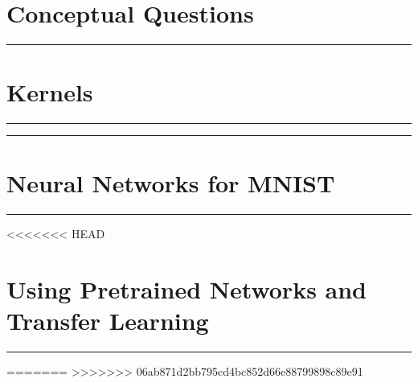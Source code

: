 \documentclass{article}
\begin{document}


\section*{Conceptual Questions}
\noindent\rule{\textwidth}{1pt}\vspace{0.75mm}


\section*{Kernels}
\noindent\rule{\textwidth}{1pt}\vspace{0.75mm}


\noindent\rule{\textwidth}{1pt}\vspace{0.75mm}


\section*{Neural Networks for MNIST}
\noindent\rule{\textwidth}{1pt}\vspace{0.75mm}


<<<<<<< HEAD
\section*{Using Pretrained Networks and Transfer Learning}
\noindent\rule{\textwidth}{1pt}\vspace{0.75mm}


=======
>>>>>>> 06ab871d2bb795cd4bc852d66e88799898c89e91
\end{document}
